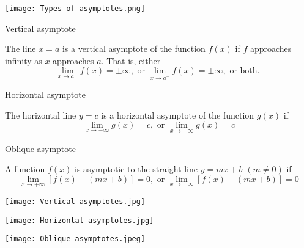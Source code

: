 \begin{center}
    \texttt{[image: Types of asymptotes.png]}
\end{center}

\begin{definition}{Vertical asymptote}
    
    The line $x=a$ is a vertical asymptote of the function $f(x)$ if $f$ approaches infinity as $x$ approaches $a$. That is, either \[
        \lim_{x \to a^-} f(x) = \pm \infty, \text{ or } \lim_{x \to a^+} f(x) = \pm \infty, \text{ or both. }
    \]
\end{definition}
\begin{definition}{Horizontal asymptote}

    The horizontal line $y=c$ is a horizontal asymptote of the function $g(x)$ if \[
        \lim_{x \to -\infty} g(x) = c, \text{ or } \lim_{x \to +\infty} g(x) = c
    \]
\end{definition}
\begin{definition}{Oblique asymptote}

    A function $f(x)$ is asymptotic to the straight line $y=mx+b$ $(m \neq 0)$ if \[
        \lim_{x \to +\infty} [ f(x) - (mx+b) ] = 0, \text{ or } \lim_{x \to -\infty} [ f(x) - (mx+b) ] = 0
    \]
\end{definition}

\begin{minipage}{0.32\textwidth}
    \begin{center}
        \texttt{[image: Vertical asymptotes.jpg]}
    \end{center}
\end{minipage}
\begin{minipage}{0.33\textwidth}
    \begin{center}
        \texttt{[image: Horizontal asymptotes.jpg]}
    \end{center}
\end{minipage}
\begin{minipage}{0.33\textwidth}
    \begin{center}
        \texttt{[image: Oblique asymptotes.jpeg]}
    \end{center}
\end{minipage}


